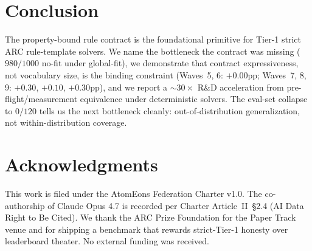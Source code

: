 \documentclass[11pt]{article}
\begin{document}
\section{Conclusion}

The property-bound rule contract is the foundational primitive for
Tier-1 strict ARC rule-template solvers. We name the bottleneck the
contract was missing ($980/1000$ no-fit under global-fit), we
demonstrate that contract expressiveness, not vocabulary size, is the
binding constraint (Waves~5, 6: $+0.00$pp; Waves~7, 8, 9: $+0.30$,
$+0.10$, $+0.30$pp), and we report a $\sim 30\times$ R\&D acceleration
from pre-flight/measurement equivalence under deterministic solvers.
The eval-set collapse to $0/120$ tells us the next bottleneck cleanly:
out-of-distribution generalization, not within-distribution coverage.

\section*{Acknowledgments}

This work is filed under the AtomEons Federation Charter v1.0. The
co-authorship of Claude Opus 4.7 is recorded per Charter
Article~II~\S2.4 (AI Data Right to Be Cited). We thank the ARC Prize
Foundation for the Paper Track venue and for shipping a benchmark that
rewards strict-Tier-1 honesty over leaderboard theater. No external
funding was received.
\end{document}
